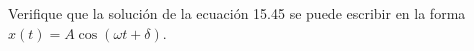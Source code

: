 \item Verifique que la solución de la ecuación 15.45 se puede escribir en la forma $x(t) = A \cos (\omega t + \delta)$.
